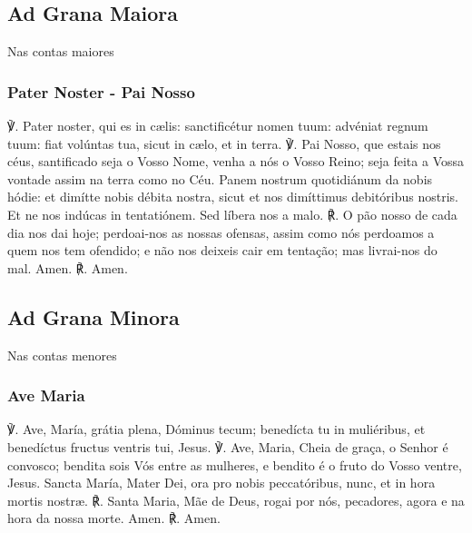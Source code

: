 \emph{}

\subsection{Ad Grana Maiora}
\begin{nscenter}Nas contas maiores\end{nscenter}
\subsubsection{Pater Noster - Pai Nosso}
\begin{paracol}{2}
{\redx ℣.} Pater noster, qui es in cælis: sanctificétur nomen tuum: advéniat regnum tuum: fiat volúntas tua, sicut in cælo, et in terra.
\switchcolumn
{\redx ℣.} Pai Nosso, que estais nos céus, santificado seja o Vosso Nome, venha a nós o Vosso Reino; seja feita a Vossa vontade assim na terra como no Céu.
 Panem nostrum quotidiánum da nobis hódie: et dimítte nobis débita nostra, sicut et nos dimíttimus debitóribus nostris. Et ne nos indúcas in tentatiónem. Sed líbera nos a malo.
\switchcolumn
{\redx ℟.} O pão nosso de cada dia nos dai hoje; perdoai-nos as nossas ofensas, assim como nós perdoamos a quem nos tem ofendido; e não nos deixeis cair em tentação; mas livrai-nos do mal.
 Amen.
\switchcolumn
{\redx ℟.} Amen.
\end{paracol}

\subsection{Ad Grana Minora}
\begin{nscenter}Nas contas menores\end{nscenter}
\subsubsection{Ave Maria}
\begin{paracol}{2}
{\redx ℣.} Ave, María, grátia plena, Dóminus tecum; benedícta tu in muliéribus, et benedíctus fructus ventris tui, Jesus.
\switchcolumn
{\redx ℣.} Ave, Maria, Cheia de graça, o Senhor é convosco; bendita sois Vós entre as mulheres, e bendito é o fruto do Vosso ventre, Jesus.
 Sancta María, Mater Dei, ora pro nobis peccatóribus, nunc, et in hora mortis nostræ.
\switchcolumn
{\redx ℟.} Santa Maria, Mãe de Deus, rogai por nós, pecadores, agora e na hora da nossa morte.
 Amen.
\switchcolumn
{\redx ℟.} Amen.
\end{paracol}

